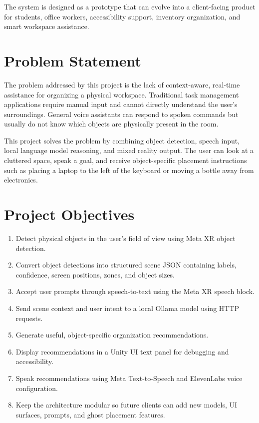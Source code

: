 \documentclass[12pt,a4paper]{article}
\begin{document}
The system is designed as a prototype that can evolve into a client-facing product for students, office workers, accessibility support, inventory organization, and smart workspace assistance.

\section{Problem Statement}

The problem addressed by this project is the lack of context-aware, real-time assistance for organizing a physical workspace. Traditional task management applications require manual input and cannot directly understand the user's surroundings. General voice assistants can respond to spoken commands but usually do not know which objects are physically present in the room.

This project solves the problem by combining object detection, speech input, local language model reasoning, and mixed reality output. The user can look at a cluttered space, speak a goal, and receive object-specific placement instructions such as placing a laptop to the left of the keyboard or moving a bottle away from electronics.

\section{Project Objectives}

\begin{enumerate}
    \item Detect physical objects in the user's field of view using Meta XR object detection.
    \item Convert object detections into structured scene JSON containing labels, confidence, screen positions, zones, and object sizes.
    \item Accept user prompts through speech-to-text using the Meta XR speech block.
    \item Send scene context and user intent to a local Ollama model using HTTP requests.
    \item Generate useful, object-specific organization recommendations.
    \item Display recommendations in a Unity UI text panel for debugging and accessibility.
    \item Speak recommendations using Meta Text-to-Speech and ElevenLabs voice configuration.
    \item Keep the architecture modular so future clients can add new models, UI surfaces, prompts, and ghost placement features.
\end{enumerate}
\end{document}
